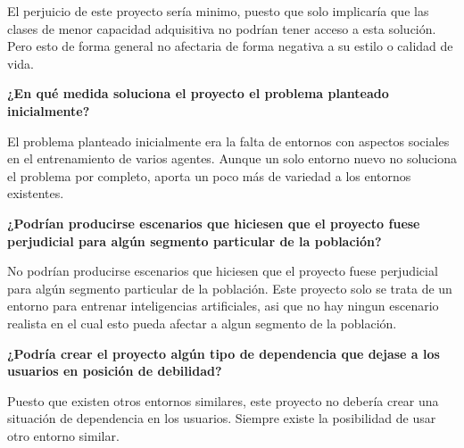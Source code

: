 El perjuicio de este proyecto sería minimo, puesto que solo implicaría que las clases de menor capacidad adquisitiva no podrían tener acceso a esta solución. Pero esto de forma general no afectaria de forma negativa a su estilo o calidad de vida.

\textbf{¿En qué medida soluciona el proyecto el problema planteado inicialmente?}

El problema planteado inicialmente era la falta de entornos con aspectos sociales en el entrenamiento de varios agentes. Aunque un solo entorno nuevo no soluciona el problema por completo, aporta un poco más de variedad a los entornos existentes.

\textbf{¿Podrían producirse escenarios que hiciesen  que el proyecto fuese perjudicial para algún segmento particular de la población?}

No podrían producirse escenarios que hiciesen que el proyecto fuese perjudicial para algún segmento particular de la población. Este proyecto solo se trata de un entorno para entrenar inteligencias artificiales, asi que no hay ningun escenario realista en el cual esto pueda afectar a algun segmento de la población.

\textbf{¿Podría crear el proyecto algún tipo de dependencia que dejase a los usuarios en posición de debilidad?}

Puesto que existen otros entornos similares, este proyecto no debería crear una situación de dependencia en los usuarios. Siempre existe la posibilidad de usar otro entorno similar.

